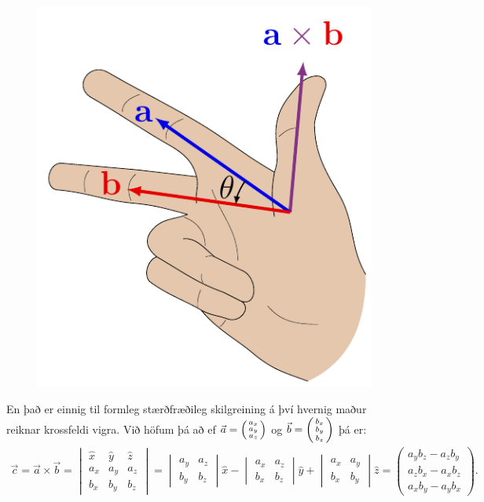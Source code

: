 \ifdefined \wholebook \else\documentclass[oneside]{book}\usepackage{EdlBook}\graphicspath{{figures/}}
\begin{document}
\begin{figure}[H]
    \centering
    \includegraphics[scale = 0.6]{figures/righthand_rule.pdf}
\end{figure}
En það er einnig til formleg stærðfræðileg skilgreining á því hvernig maður reiknar krossfeldi vigra. Við höfum þá að ef $\vec{a} = \smqty(a_x \\ a_y \\ a_z)$ og $\vec{b} = \smqty(b_x \\ b_y \\ b_z)$ þá er:
\begin{align*}
    \vec{c} = \vec{a} \times \vec{b} = \begin{vmatrix} \hat{x} & \hat{y} & \hat{z} \\ a_x & a_y & a_z  \\ b_x & b_y & b_z \end{vmatrix} = \begin{vmatrix} a_y & a_z \\ b_y & b_z \end{vmatrix} \hat{x} -\begin{vmatrix} a_x & a_z \\ b_x & b_z \end{vmatrix} \hat{y} + \begin{vmatrix} a_x & a_y \\ b_x & b_y \end{vmatrix} \hat{z}  = \begin{pmatrix} a_y b_z - a_z b_y \\ a_z b_x - a_x b_z \\ a_x b_y - a_y b_x \end{pmatrix}.
\end{align*}
\end{document}
